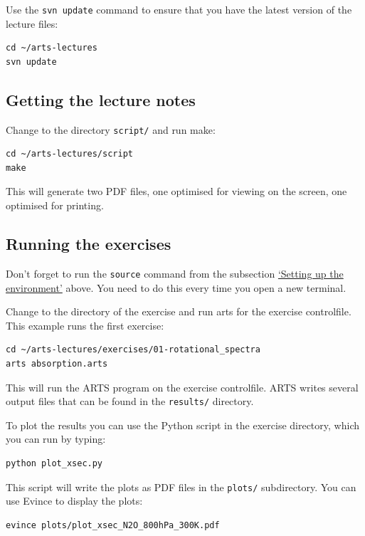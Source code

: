 Use the \verb|svn update| command to ensure that you have the latest version
of the lecture files:

\begin{verbatim}
cd ~/arts-lectures
svn update
\end{verbatim}

\subsection*{Getting the lecture notes}

Change to the directory \texttt{script/} and run make:

\begin{verbatim}
cd ~/arts-lectures/script
make
\end{verbatim}

This will generate two PDF files, one optimised for viewing on the screen, one
optimised for printing.

\subsection*{Running the exercises}

Don't forget to run the \verb|source| command from the subsection
\hyperref[sec:setup-env]{`Setting up the environment'} above. You need to do
this every time you open a new terminal.

Change to the directory of the exercise and run arts for the exercise
controlfile. This example runs the first exercise:

\begin{verbatim}
cd ~/arts-lectures/exercises/01-rotational_spectra
arts absorption.arts
\end{verbatim}

This will run the ARTS program on the exercise controlfile. ARTS writes
several output files that can be found in the \texttt{results/} directory.

To plot the results you can use the Python script in the exercise directory,
which you can run by typing:

\begin{verbatim}
python plot_xsec.py
\end{verbatim}

This script will write the plots as PDF files in the \texttt{plots/}
subdirectory. You can use Evince to display the plots:

\begin{verbatim}
evince plots/plot_xsec_N2O_800hPa_300K.pdf
\end{verbatim}

